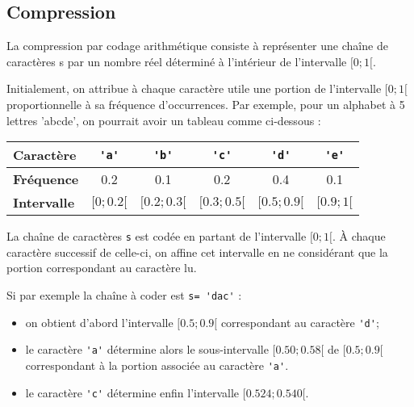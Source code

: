 

\subsection{Compression}
La compression par codage arithmétique consiste à représenter une chaîne de caractères s par un nombre réel déterminé à l'intérieur de l'intervalle $[0 ; 1[$.

Initialement, on attribue à chaque caractère utile une portion de l'intervalle $[0 ; 1[$ proportionnelle à sa fréquence d'occurrences. Par exemple, pour un alphabet à 5 lettres 'abcde', on pourrait avoir un tableau comme ci-dessous :

\begin{center}
\begin{tabular}{lccccc}
\hline
\textbf{Caractère} & \lstinline{'a'} & \lstinline{'b'} & \lstinline{'c'} & \lstinline{'d'} & \lstinline{'e'} \\
\hline
\textbf{Fréquence} & 0.2 & 0.1 & 0.2 & 0.4 & 0.1 \\
\hline
\textbf{Intervalle} & $[0 ; 0.2[$ & $[0.2 ; 0.3[$ & $[0.3 ; 0.5[$ & $[0.5 ; 0.9[$ & $[0.9 ; 1[$ \\
\hline
\end{tabular}
\end{center}

La chaîne de caractères \lstinline{s} est codée en partant de l'intervalle $[0 ; 1[$. À chaque caractère successif de celle-ci, on affine cet intervalle en ne considérant que la portion correspondant au caractère lu.

Si par exemple la chaîne à coder est \lstinline{s= 'dac'} :

\begin{itemize}
  \item on obtient d'abord l'intervalle $[0.5; 0.9 [$ correspondant au caractère \lstinline{'d'};
  \item le caractère \lstinline{'a'} détermine alors le sous-intervalle $[0.50 ; 0.58[$ de $[0.5 ; 0.9[$ correspondant à la portion associée au caractère \lstinline{'a'}.
  \item le caractère \lstinline{'c'} détermine enfin l'intervalle $[0.524; 0.540[$.
\end{itemize}

